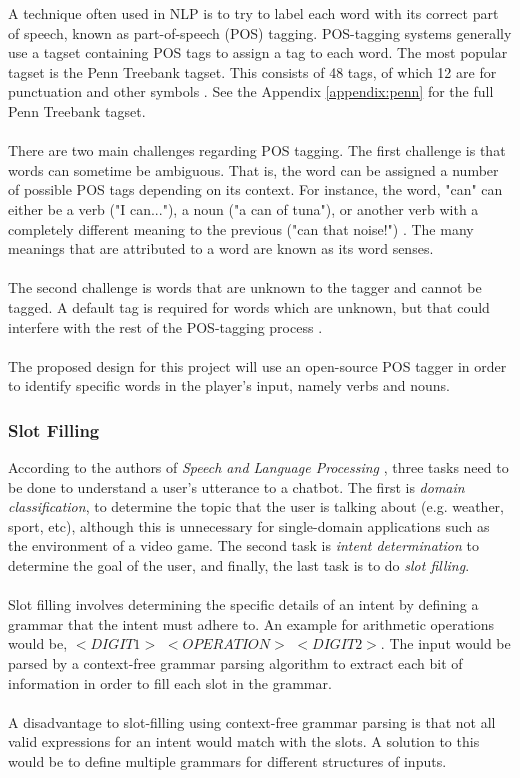 \documentclass[12pt]{article}
\begin{document}
A technique often used in NLP is to try to label each word with its correct part of speech, known as part-of-speech (POS) tagging. POS-tagging systems generally use a tagset containing POS tags to assign a tag to each word. The most popular tagset is the Penn Treebank tagset. This consists of 48 tags, of which 12 are for punctuation and other symbols \cite{RefWorks:41}. See the Appendix \ref{appendix:penn} for the full Penn Treebank tagset.
\\
\\
There are two main challenges regarding POS tagging. The first challenge is that words can sometime be ambiguous. That is, the word can be assigned a number of possible POS tags depending on its context. For instance, the word, "can" can either be a verb ("I can..."), a noun ("a can of tuna"), or another verb with a completely different meaning to the previous ("can that noise!") \cite{RefWorks:43}. The many meanings that are attributed to a word are known as its word senses.
\\
\\
The second challenge is words that are unknown to the tagger and cannot be tagged. A default tag is required for words which are unknown, but that could interfere with the rest of the POS-tagging process \cite{RefWorks:41}.
\\
\\
The proposed design for this project will use an open-source POS tagger in order to identify specific words in the player's input, namely verbs and nouns.

\subsubsection{Slot Filling}

According to the authors of \textit{Speech and Language Processing} \cite{RefWorks:107}, three tasks need to be done to understand a user's utterance to a chatbot. The first is \textit{domain classification}, to determine the topic that the user is talking about (e.g. weather, sport, etc), although this is unnecessary for single-domain applications such as the environment of a video game. The second task is \textit{intent determination} to determine the goal of the user, and finally, the last task is to do \textit{slot filling}.
\\
\\
Slot filling involves determining the specific details of an intent by defining a grammar that the intent must adhere to. An example for arithmetic operations would be, $<DIGIT1>$ $<OPERATION>$ $<DIGIT2>$. The input would be parsed by a context-free grammar parsing algorithm to extract each bit of information in order to fill each slot in the grammar.
\\
\\
A disadvantage to slot-filling using context-free grammar parsing is that not all valid expressions for an intent would match with the slots. A solution to this would be to define multiple grammars for different structures of inputs.
\end{document}
